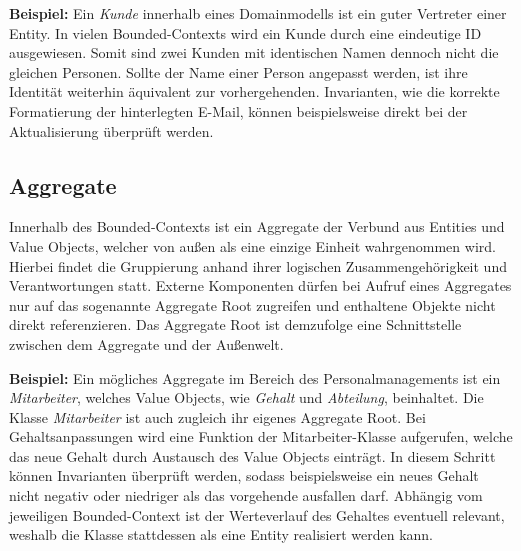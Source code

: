 \textbf{Beispiel:} Ein \emph{Kunde} innerhalb eines Domainmodells ist ein guter Vertreter einer Entity. In vielen Bounded-Contexts wird ein Kunde durch eine eindeutige ID ausgewiesen. Somit sind zwei Kunden mit identischen Namen dennoch nicht die gleichen Personen. Sollte der Name einer Person angepasst werden, ist ihre Identität weiterhin äquivalent zur vorhergehenden. Invarianten, wie die korrekte Formatierung der hinterlegten E-Mail, können beispielsweise direkt bei der Aktualisierung überprüft werden.


\subsection{Aggregate}

Innerhalb des Bounded-Contexts ist ein Aggregate der Verbund aus Entities und Value Objects, welcher von außen als eine einzige Einheit wahrgenommen wird. Hierbei findet die Gruppierung anhand ihrer logischen Zusammengehörigkeit und Verantwortungen statt. Externe Komponenten dürfen bei Aufruf eines Aggregates nur auf das sogenannte Aggregate Root zugreifen und enthaltene Objekte nicht direkt referenzieren. Das Aggregate Root ist demzufolge eine Schnittstelle zwischen dem Aggregate und der Außenwelt. \cite[S. 126f.]{Evans.2011}

\textbf{Beispiel:} Ein mögliches Aggregate im Bereich des Personalmanagements ist ein \emph{Mitarbeiter}, welches Value Objects, wie \emph{Gehalt} und \emph{Abteilung}, beinhaltet. Die Klasse \emph{Mitarbeiter} ist auch zugleich ihr eigenes Aggregate Root. Bei Gehaltsanpassungen wird eine Funktion der Mitarbeiter-Klasse aufgerufen, welche das neue Gehalt durch Austausch des Value Objects einträgt. In diesem Schritt können Invarianten überprüft werden, sodass beispielsweise ein neues Gehalt nicht negativ oder niedriger als das vorgehende ausfallen darf. Abhängig vom jeweiligen Bounded-Context ist der Werteverlauf des Gehaltes eventuell relevant, weshalb die Klasse stattdessen als eine Entity realisiert werden kann. 

